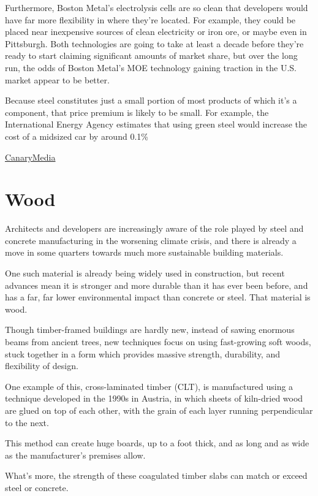 \documentclass[
]{book}
\begin{document}
Furthermore, Boston Metal's electrolysis cells are so clean that developers would have far more flexibility in where they're located. For example, they could be placed near inexpensive sources of clean electricity or iron ore, or maybe even in Pittsburgh. Both technologies are going to take at least a decade before they're ready to start claiming significant amounts of market share, but over the long run, the odds of Boston Metal's MOE technology gaining traction in the U.S. market appear to be better.

Because steel constitutes just a small portion of most products of which it's a component, that price premium is likely to be small. For example, the International Energy Agency estimates that using green steel would increase the cost of a midsized car by around 0.1\%

\href{https://www.canarymedia.com/articles/joe-bidens-green-new-steel/}{CanaryMedia}

\hypertarget{wood}{%
\chapter{Wood}\label{wood}}

Architects and developers are increasingly aware of the role played by steel and concrete manufacturing in the worsening climate crisis, and there is already a move in some quarters towards much more sustainable building materials.

One such material is already being widely used in construction, but recent advances mean it is stronger and more durable than it has ever been before, and has a far, far lower environmental impact than concrete or steel. That material is wood.

Though timber-framed buildings are hardly new, instead of sawing enormous beams from ancient trees, new techniques focus on using fast-growing soft woods, stuck together in a form which provides massive strength, durability, and flexibility of design.

One example of this, cross-laminated timber (CLT), is manufactured using a technique developed in the 1990s in Austria, in which sheets of kiln-dried wood are glued on top of each other, with the grain of each layer running perpendicular to the next.

This method can create huge boards, up to a foot thick, and as long and as wide as the manufacturer's premises allow.

What's more, the strength of these coagulated timber slabs can match or exceed steel or concrete.
\end{document}
